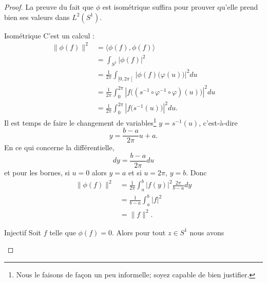 \begin{proof}
    La preuve du fait que \( \phi\) est isométrique suffira pour prouver qu'elle prend bien ses valeurs dans \( L^2(S^1)\).
    \begin{subproof}
        \item[Isométrique]
            C'est un calcul :
            \begin{subequations}
                \begin{align}
                    \| \phi(f) \|^2&=\langle \phi(f), \phi(f)\rangle \\
                    &=\int_{S^1}| \phi(f) |^2\\
                    &=\frac{1}{ 2\pi }\int_{\mathopen[ 0 , 2\pi \mathclose[}| \phi(f)\big( \varphi(u) \big) |^2du\\
                        &=\frac{1}{ 2\pi }\int_0^{2\pi}| f\big( (s^{-1}\circ\varphi^{-1}\circ\varphi)(u) \big) |^2du\\
                        &=\frac{1}{ 2\pi }\int_0^{2\pi}| f\big( s^{-1}(u) \big) |^2du.
                \end{align}
            \end{subequations}
            Il est temps de faire le changement de variables\footnote{Nous le faisons de façon un peu informelle; soyez capable de bien justifier.} \( y=s^{-1}(u)\), c'est-à-dire
            \begin{equation}
                y=\frac{ b-a }{ 2\pi }u+a.
            \end{equation}
            En ce qui concerne la différentielle,
            \begin{equation}
                dy=\frac{ b-a }{ 2\pi }du
            \end{equation}
            et pour les bornes, si \( u=0\) alors \( y=a\) et si \( u=2\pi\), \( y=b\). Donc
            \begin{subequations}
                \begin{align}
                    \| \phi(f) \|^2&=\frac{1}{ 2\pi }\int_a^b| f(y) |^2\frac{ 2\pi }{ b-a }dy\\
                    &=\frac{1}{ b-a }\int_a^b| f |^2\\
                    &=\| f \|^2.
                \end{align}
            \end{subequations}
        \item[Injectif]
            Soit \( f\) telle que \( \phi(f)=0\). Alors pour tout \( z\in S^1\) nous avons

\end{subproof}
\end{proof}
